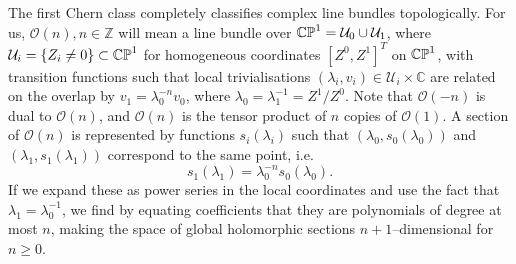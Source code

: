 The first Chern class completely classifies complex line bundles topologically. For us, $\mathcal{O}(n),n\in\mathbb{Z}$ will mean a line bundle over $\mathbb{CP}^1=\mathcal{U}_0\cup\mathcal{U}_1$, where $\mathcal{U}_i=\{Z_i\neq 0\}\subset\mathbb{CP}^1$ for homogeneous coordinates $[Z^0,Z^1]^T$ on $\mathbb{CP}^1$, with transition functions such that local trivialisations $(\lambda_i,v_i)\in\mathcal{U}_i\times\mathbb{C}$ are related on the overlap by $v_1=\lambda_0^{-n}v_0$, where $\lambda_0=\lambda_1^{-1}=Z^1/Z^0$. Note that $\mathcal{O}(-n)$ is dual to $\mathcal{O}(n)$, and $\mathcal{O}(n)$ is the tensor product of $n$ copies of $\mathcal{O}(1)$. A section of $\mathcal{O}(n)$ is represented by functions $s_i(\lambda_i)$ such that $(\lambda_0,s_0(\lambda_0))$ and $(\lambda_1,s_1(\lambda_1))$ correspond to the same point, i.e.
\[
s_1(\lambda_1)=\lambda_0^{-n}s_0(\lambda_0).
\]
If we expand these as power series in the local coordinates and use the fact that ${\lambda}_1=\lambda_0^{-1}$, we find by equating coefficients that they are polynomials of degree at most $n$, making the space of global holomorphic sections $n+1$--dimensional for $n\geq 0$.




